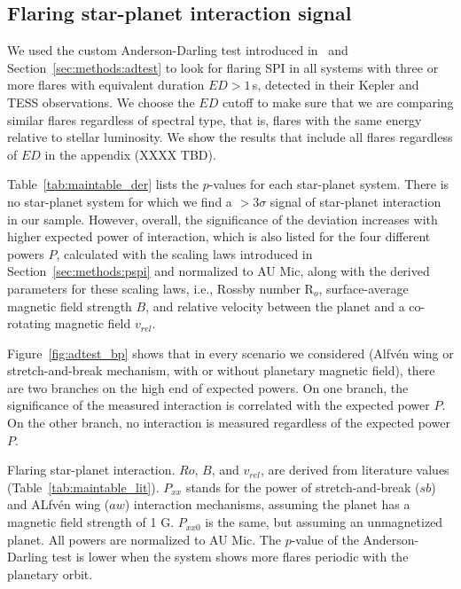 \documentclass[twocolumn]{aastex631}
\begin{document}
\subsection{Flaring star-planet interaction signal}
\label{sec:results:spi}
We used the custom Anderson-Darling test introduced in~\citet{ilin2022searching} and Section~\ref{sec:methods:adtest} to look for flaring SPI in all systems with three or more flares with equivalent duration $ED>1\,$s, detected in their Kepler and TESS observations. We choose the $ED$ cutoff to make sure that we are comparing similar flares regardless of spectral type, that is, flares with the same energy relative to stellar luminosity. We show the results that include all flares regardless of $ED$ in the appendix (XXXX TBD).

Table~\ref{tab:maintable_der} lists the $p$-values for each star-planet system. There is no star-planet system for which we find a $>3\sigma$ signal of star-planet interaction in our sample. However, overall, the significance of the deviation increases with higher expected power of interaction, which is also listed for the four different powers $P$, calculated with the scaling laws introduced in Section~\ref{sec:methods:pspi} and normalized to AU Mic, along with the derived parameters for these scaling laws, i.e., Rossby number R$_o$, surface-average magnetic field strength $B$, and relative velocity between the planet and a co-rotating magnetic field $v_{rel}$. 

Figure~\ref{fig:adtest_bp} shows that in every scenario we considered (Alfv\'en wing or stretch-and-break mechanism, with or without planetary magnetic field), there are two branches on the high end of expected powers. On one branch, the significance of the measured interaction is correlated with the expected power $P$. On the other branch, no interaction is measured regardless of the expected power $P$. 



\begin{table*}
\footnotesize
\movetableright=-20mm
\caption{Flaring star-planet interaction. $Ro$, $B$, and $v_{rel}$, are derived from literature values (Table~\ref{tab:maintable_lit}). $P_{xx}$ stands for the power of stretch-and-break ($sb$) and ALfv\'en wing ($aw$) interaction mechanisms, assuming the planet has a magnetic field strength of 1 G. $P_{xx0}$ is the same, but assuming an unmagnetized planet. All powers are normalized to AU Mic. The $p$-value of the Anderson-Darling test is lower when the system shows more flares periodic with the planetary orbit.}

    \label{tab:maintable_der}

\end{table*}
\end{document}
